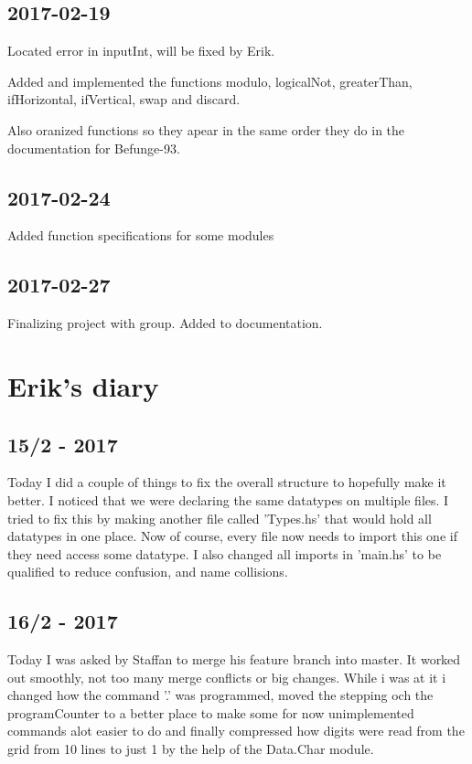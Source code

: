 \documentclass[12pt, a4paper]{article}
\begin{document}
\subsection*{2017-02-19}

Located error in inputInt, will be fixed by Erik.

Added and implemented the functions modulo, logicalNot, greaterThan, ifHorizontal, ifVertical, swap and discard.

Also oranized functions so they apear in the same order they do in the documentation for Befunge-93.

\subsection*{2017-02-24}

Added function specifications for some modules

\subsection*{2017-02-27}

Finalizing project with group. Added to documentation.

\section*{Erik's diary}

\subsection*{15/2 - 2017}
Today I did a couple of things to fix the overall structure to hopefully make it better.
I noticed that we were declaring the same datatypes on multiple files. I tried
to fix this by making another file called 'Types.hs' that would hold all datatypes
in one place. Now of course, every file now needs to import this one if they need
access some datatype.
I also changed all imports in 'main.hs' to be qualified to reduce confusion, and
name collisions.

\subsection*{16/2 - 2017}
Today I was asked by Staffan to merge his feature branch into master. It worked out
smoothly, not too many merge conflicts or big changes. While i was at it i changed
how the command '.' was programmed, moved the stepping och the programCounter to
a better place to make some for now unimplemented commands alot easier to do
and finally compressed how digits were read from the grid from 10 lines to just 1
by the help of the Data.Char module.
\end{document}

